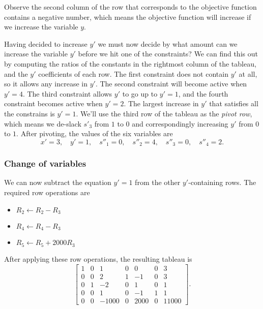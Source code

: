 \documentclass[11pt,oneside]{article}
\begin{document}
		Observe the second column of the row that corresponds to the objective function contains a negative number,
		which means the objective function will increase if we increase the variable $y$.

		
		Having decided to increase $y'$
		we must now decide by what amount can we increase the variable $y'$ before we hit one of the constraints?
		We can find this out by computing the ratios of the constants in the rightmost column of the tableau,
		and the $y'$ coefficients of each row.
		The first constraint does not contain $y'$ at all, so it allows any increase in $y'$.
		The second constraint will become active when $y' = 4$.
		The third constraint allows $y'$ to go up to $y'=1$,
		and the fourth constraint becomes active when $y'=2$.
		The largest increase in $y'$ that satisfies all the constrains is $y'=1$.
		We'll use the third row of the tableau as the \emph{pivot row},
		which means we de-slack $s'_3$ from $1$ to $0$ and correspondingly increasing $y'$ from $0$ to $1$.
		After pivoting, the values of the six variables are
		\[
			x'=3, \quad y'=1, \quad s''_1=0, \quad s''_2=4,  \quad s''_3=0, \quad s''_4=2.
		\]
		
		
	\subsubsection{Change of variables}
	
		We can now subtract the equation $y'=1$ from the other $y'$-containing rows.
		The required row operations are
		\begin{itemize}
			\item $R_2 \gets R_2 - R_3$
			\item $R_4 \gets R_4 - R_3$
			\item $R_5 \gets R_5 + 2000R_3$
		\end{itemize}		
		After applying these row operations, the resulting tableau is
		\[
		\left[
		\begin{array}{rrrrrr|r}
		1& 0&     1& 0&    0& 0&     3      \\ 
		0& 0&     2& 1&   -1& 0&     3      \\ 
		0& 1&    -2& 0&    1& 0&     1      \\ 
		0& 0&     1& 0&   -1& 1&     1      \\ 
		0& 0& -1000& 0& 2000& 0& 11000      
		\end{array}
		\right].		
		\]
		
\end{document}
